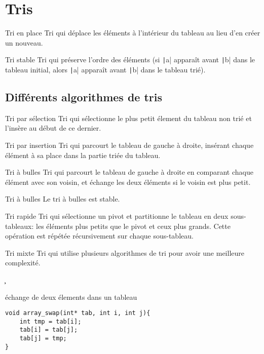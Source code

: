 \section{Tris}
\begin{df*}{Tri en place}
Tri qui déplace les éléments à l'intérieur du tableau au lieu d'en créer un nouveau.
\end{df*}
\begin{df*}{Tri stable}
Tri qui préserve l'ordre des éléments (si \texttt|a| apparaît avant \texttt|b| dans le tableau initial, alors \texttt|a| apparaît avant \texttt|b| dans le tableau trié).
\end{df*}
\subsection{Différents algorithmes de tris}
\begin{df*}{Tri par sélection}
Tri qui sélectionne le plus petit élement du tableau non trié et l'insère au début de ce dernier.
\end{df*}
\begin{df*}{Tri par insertion}
Tri qui parcourt le tableau de gauche à droite, insérant chaque élément à sa place dans la partie triée du tableau.
\end{df*}
\begin{df*}{Tri à bulles}
Tri qui parcourt le tableau de gauche à droite en comparant chaque élément avec son voisin, et échange les deux éléments si le voisin est plus petit.
\end{df*}
\begin{pt*}{Tri à bulles}
Le tri à bulles est stable.
\end{pt*}
\begin{df*}{Tri rapide}
Tri qui sélectionne un pivot et partitionne le tableau en deux sous-tableaux: les éléments plus petits que le pivot et ceux plus grands. Cette opération est répétée récursivement sur chaque sous-tableau.
\end{df*}
\begin{df*}{Tri mixte}
Tri qui utilise plusieurs algorithmes de tri pour avoir une meilleure complexité.
\end{df*}
\c
\begin{imp*}{échange de deux élements dans un tableau}
\begin{verbatim}
void array_swap(int* tab, int i, int j){
    int tmp = tab[i];
    tab[i] = tab[j];
    tab[j] = tmp;
}
\end{verbatim}
\end{imp*}
